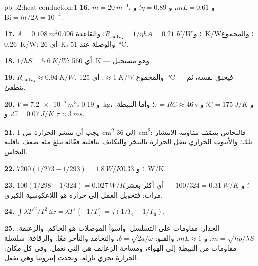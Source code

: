 \begin{solution}{pb:b2:heat-conduction:1}
\textbf{16.} $m = \qty{20}{m^{-1}}$، و $mL = 0.61$، و $\eta = 0.89$؛ و $\mathrm{Bi} = ht/2\lambda
= 10^{-4}$.

\textbf{17.} $A = \qty{0.108}{m^2}$؛ و $R_{\text{زعانف}} = 1/\eta hA = \qty{0.21}{K/W}$؛ والقاعدة
\qty{0.006}{K/W}؛ والمجموع \qty{0.26}{K/W}: أي \qty{26}{K}، والوصلة عند \qty{51}{\celsius}.

\textbf{18.} $1/hS = \qty{5.6}{K/W}$: أي \qty{560}{K} --- وهو مستحيل.

\textbf{19.} $R_{\text{زعانف}} \approx \qty{0.94}{K/W}$، والمجموع $\approx \qty{1}{K/W}$:
أي \qty{125}{\celsius} --- فيخنق نفسه، ثم ينطفئ.

\textbf{20.} $V = \qty{7.2e-5}{m^3}$، و \qty{0.19}{kg}، و $C = \qty{175}{J/K}$؛ و $\tau = RC
\approx \qty{46}{s}$؛ وأما النبيطة: $C = \qty{0.07}{J/K}$، و $\tau \approx \qty{3}{ms}$.

\textbf{21.} يجب أن تنتشر الحرارة من \qty{1}{cm^2} إلى \qty{36}{cm^2}: فالنحاس
ينصّف مقاومة الانتشار تلك؛ والأنبوب الحراري ينقل الحرارة
بالتبخر والتكاثف بناقلية فعّالة تبلغ مئة
ضعف ناقلية النحاس.

\textbf{22.} $7200(1/273 - 1/293) = \qty{1.8}{W/K}$؛ و \qty{0.33}{W/K}.

\textbf{23.} $100(1/298 - 1/324) = \qty{0.027}{W/K}$؛ و $100/324 = \qty{0.31}{W/K}$ ---
أي أكثر بعشر مرات: فتحويل العمل إلى حرارة هو اللاعكوسية الكبرى.

\textbf{24.} $\int\lambda T'^2/T^2\,\dd x = \lambda T'\,[-1/T] = j(1/T_{\text{c}} -
1/T_{\text{h}})$.

\textbf{25.} الجدار: مقاومات على التسلسل، وأسوأ الموصلات هو الحاكم.
والزعنفة: $m = \sqrt{hp/\lambda S}$، و $mL \approx 1$. والقبو: $\delta = \sqrt{2a/\omega}$،
والتخامد والتأخر معًا. والرقاقة: سلسلة مقاومات من النبيطة إلى
الهواء، ومساحة الزعانف هي التي تعمل. وفي كل مكان: الحرارة تجري نازلة،
وتحدث إنتروبيا وهي تفعل.
\end{solution}
